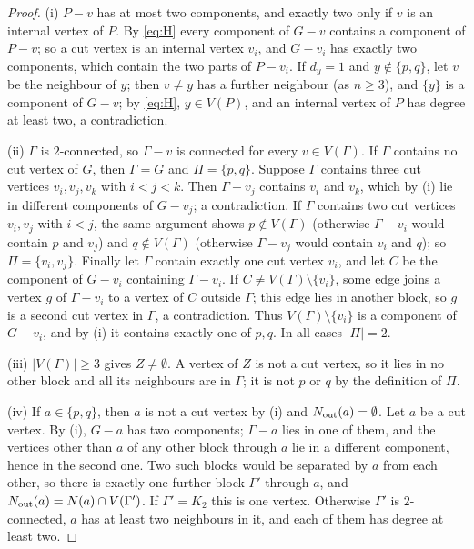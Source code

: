 \documentclass[11pt]{article}
\theoremstyle{definition}
\theoremstyle{remark}
\begin{document}
\begin{proof}
(i) $P-v$ has at most two components, and exactly two only if $v$ is an internal vertex of
$P$. By \eqref{eq:H} every component of $G-v$ contains a component of $P-v$; so a cut vertex is
an internal vertex $v_i$, and $G-v_i$ has exactly two components, which contain the two parts
of $P-v_i$. If $d_y=1$ and $y\notin\{p,q\}$, let $v$ be the neighbour of $y$; then $v\ne y$
has a further neighbour (as $n\ge3$), and $\{y\}$ is a component of $G-v$; by \eqref{eq:H},
$y\in V(P)$, and an internal vertex of $P$ has degree at least two, a contradiction.

(ii) $\Gamma$ is $2$-connected, so $\Gamma-v$ is connected for every $v\in V(\Gamma)$. If
$\Gamma$ contains no cut vertex of $G$, then $\Gamma=G$ and $\Pi=\{p,q\}$. Suppose $\Gamma$
contains three cut vertices $v_i,v_j,v_k$ with $i<j<k$. Then $\Gamma-v_j$ contains $v_i$ and
$v_k$, which by (i) lie in different components of $G-v_j$; a contradiction. If $\Gamma$
contains two cut vertices $v_i,v_j$ with $i<j$, the same argument shows $p\notin V(\Gamma)$
(otherwise $\Gamma-v_i$ would contain $p$ and $v_j$) and $q\notin V(\Gamma)$ (otherwise
$\Gamma-v_j$ would contain $v_i$ and $q$); so $\Pi=\{v_i,v_j\}$. Finally let $\Gamma$ contain
exactly one cut vertex $v_i$, and let $C$ be the component of $G-v_i$ containing
$\Gamma-v_i$. If $C\ne V(\Gamma)\setminus\{v_i\}$, some edge joins a vertex $g$ of
$\Gamma-v_i$ to a vertex of $C$ outside $\Gamma$; this edge lies in another block, so $g$ is a
second cut vertex in $\Gamma$, a contradiction. Thus $V(\Gamma)\setminus\{v_i\}$ is a
component of $G-v_i$, and by (i) it contains exactly one of $p,q$. In all cases
$|\Pi|=2$.

(iii) $|V(\Gamma)|\ge3$ gives $Z\ne\emptyset$. A vertex of $Z$ is not a cut vertex, so it lies
in no other block and all its neighbours are in $\Gamma$; it is not $p$ or $q$ by the
definition of $\Pi$.

(iv) If $a\in\{p,q\}$, then $a$ is not a cut vertex by (i) and $N_{\rm out}(a)=\emptyset$.
Let $a$ be a cut vertex. By (i), $G-a$ has two components; $\Gamma-a$ lies in one of them,
and the vertices other than $a$ of any other block through $a$ lie in a different component,
hence in the second one. Two such blocks would be separated by $a$ from each other, so there
is exactly one further block $\Gamma'$ through $a$, and $N_{\rm out}(a)=N(a)\cap V(\Gamma')$.
If $\Gamma'=K_2$ this is one vertex. Otherwise $\Gamma'$ is $2$-connected, $a$ has at least
two neighbours in it, and each of them has degree at least two.
\end{proof}
\end{document}
